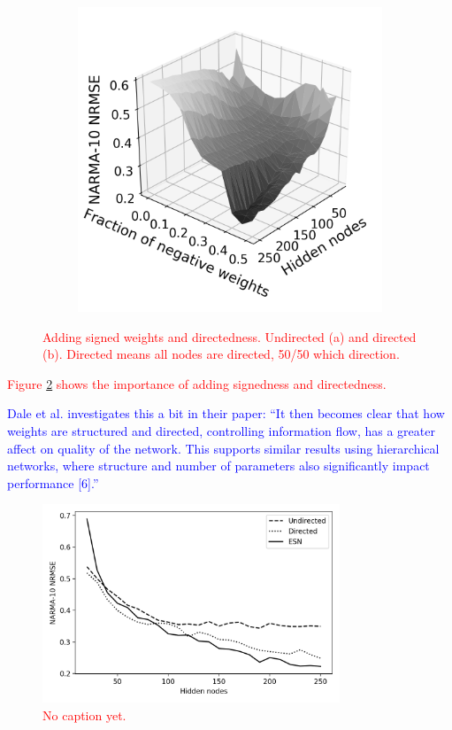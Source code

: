 \begin{figure}[t]
\begin{subfigure}{.49\textwidth}
    \includegraphics[width=1.0\linewidth]{figures/perf-rest-dir.png}
    \caption{}
    \label{fig:perf-restore-b}
  \end{subfigure}
  \caption{
    \textcolor{red}{
      Adding signed weights and directedness. Undirected (a) and directed
(b). Directed means all nodes are directed, 50/50 which direction.
    }
  }
  \label{fig:perf-restore}
\end{figure}

\textcolor{red}{
  Figure \ref{fig:perf-restore} shows the importance of adding signedness and
directedness.
}

\textcolor{blue}{
  Dale et al. investigates this a bit in their paper: ``It then becomes clear
that how weights are structured and directed, controlling information flow, has
a greater affect on quality of the network. This supports similar results using
hierarchical networks, where structure and number of parameters also
significantly impact performance [6].''
}

\begin{figure}[t]
  \centering
  \includegraphics[width=3.5in]{figures/perf-rest-comp.png}
  \caption{
    \textcolor{red}{
      No caption yet.
    }
  }
  \label{fig:perf-rest-comp}
\end{figure}

